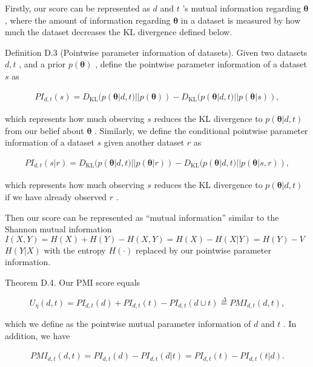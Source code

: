 Firstly, our score can be represented as \(d\) and \(t\) 's mutual
information regarding \(\pmb \theta\) , where the amount of information
regarding \(\pmb \theta\) in a dataset is measured by how much the
dataset decreases the KL divergence defined below.

Definition D.3 (Pointwise parameter information of datasets). Given two
datasets \(d , t\) , and a prior \(p ( \pmb \theta )\) , define the
pointwise parameter information of a dataset \(s\) as

\[
\begin{array} { r } { P I _ { d , t } ( s ) = D _ { \mathrm { K L } } ( p ( \pmb { \theta } | d , t ) | | p ( \pmb { \theta } ) ) - D _ { \mathrm { K L } } ( p ( \pmb { \theta } | d , t ) | | p ( \pmb { \theta } | s ) ) , } \end{array}
\]

which represents how much observing \(s\) reduces the KL divergence to
\(p ( \pmb \theta | d , t )\) from our belief about \(\pmb \theta\) .
Similarly, we define the conditional pointwise parameter information of
a dataset \(s\) given another dataset \(r\) as

\[
\begin{array} { r } { P I _ { d , t } ( s | r ) = D _ { \mathrm { K L } } ( p ( \pmb \theta | d , t ) | | p ( \pmb \theta | r ) ) - D _ { \mathrm { K L } } ( p ( \pmb \theta | d , t ) | | p ( \pmb \theta | s , r ) ) , } \end{array}
\]

which represents how much observing \(s\) reduces the KL divergence to
\(p ( \pmb \theta | d , t )\) if we have already observed \(r\) .

Then our score can be represented as ``mutual information'' similar to
the Shannon mutual information
\(I ( X , Y ) = H ( X ) + H ( Y ) - H ( X , Y ) = H ( X ) - H ( X \vert Y ) = H ( Y ) - V\)
\(H ( Y | X )\) with the entropy \(H ( \cdot )\) replaced by our
pointwise parameter information.

Theorem D.4. Our PMI score equals

\[
U _ { \eta } ( d , t ) = P I _ { d , t } ( d ) + P I _ { d , t } ( t ) - P I _ { d , t } ( d \cup t ) \stackrel { \Delta } { = } P M I _ { d , t } ( d , t ) ,
\]

which we define as the pointwise mutual parameter information of \(d\)
and \(t\) . In addition, we have

\[
\begin{array} { r } { P M I _ { d , t } ( d , t ) = P I _ { d , t } ( d ) - P I _ { d , t } ( d | t ) = P I _ { d , t } ( t ) - P I _ { d , t } ( t | d ) . } \end{array}
\]

